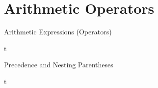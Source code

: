\documentclass[../lecture2-variables.tex]{subfiles}
\begin{document}
\section{Arithmetic Operators}


\begin{frame}[fragile]{Arithmetic Expressions (Operators)}

t

\end{frame}


\begin{frame}[fragile]{Precedence and Nesting Parentheses}

t

\end{frame}

\end{document}

